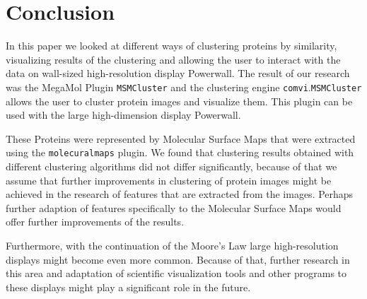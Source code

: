 \documentclass[journal]{vgtc}       %
\begin{document}
\section{Conclusion}
In this paper we looked at different ways of clustering proteins by similarity, visualizing results of the clustering and allowing the user to interact with the data on wall-sized high-resolution display Powerwall. The result of our research was the  MegaMol Plugin \verb|MSMCluster| and the clustering engine \verb|comvi|.\verb|MSMCluster| allows the user to cluster  protein images and visualize them. This plugin can be used with the large high-dimension display Powerwall. 

These Proteins were represented by Molecular Surface Maps that were extracted using the \verb|molecuralmaps| plugin.
We found that clustering results obtained with different clustering algorithms did not differ significantly, because of that we assume that further improvements in clustering of protein images might be achieved in the research of features that are extracted from the images. Perhaps further adaption of features specifically to the Molecular Surface Maps would offer further improvements of the results. 

Furthermore, with the continuation of the Moore's Law large high-resolution displays might become even more common. Because of that, further research in this area and adaptation of scientific visualization tools and other programs to these displays might play a significant role in the future.



 
\end{document}
